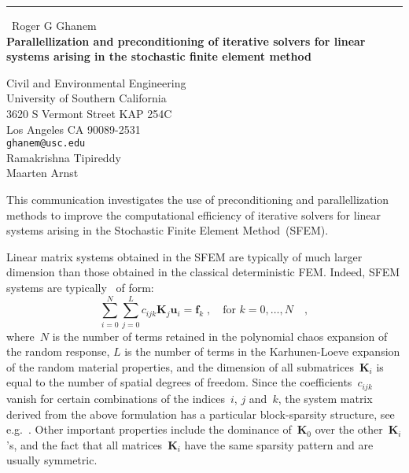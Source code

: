 \documentclass{report}
\begin{document}
\begin{center}
\rule{6in}{1pt} \
{\large Roger G Ghanem \\
{\bf Parallellization and preconditioning of iterative solvers for linear systems arising in the stochastic finite element method}}

Civil and Environmental Engineering \\ University of Southern California \\ 3620 S Vermont Street KAP 254C \\ Los Angeles CA 90089-2531
\\
{\tt ghanem@usc.edu}\\
Ramakrishna Tipireddy\\
Maarten Arnst\end{center}

This communication investigates the use of preconditioning and
parallellization methods to improve the computational efficiency of
iterative solvers for linear systems arising in the Stochastic Finite
Element Method~(SFEM).

Linear matrix systems obtained in the SFEM are typically of much larger
dimension than those obtained in the classical deterministic FEM. Indeed,
SFEM systems are typically~\cite{ghanem1991} of form:
\begin{equation}
\sum_{i=0}^{N}\sum_{j=0}^{L}c_{ijk}\boldsymbol{K}_{j}\boldsymbol{u}_{i}=\boldsymbol{f}_{k}\;,\quad\text{for~$k
= 0,\ldots,N$}\quad,\label{eq:sfemsystem}
\end{equation}
where~$N$ is the number of terms retained in the polynomial chaos
expansion of the random response, $L$ is the number of terms in the
Karhunen-Loeve expansion of the random material properties, and the
dimension of all submatrices~$\boldsymbol{K}_{i}$ is equal to the number
of spatial degrees of freedom. Since the coefficients~$c_{ijk}$ vanish
for certain combinations of the indices~$i$, $j$ and~$k$, the system
matrix derived from the above formulation has a particular block-sparsity
structure, see e.g.~\cite{pellisetti2000}. Other important properties
include the dominance of~$\boldsymbol{K}_0$ over the
other~$\boldsymbol{K}_i$'s, and the fact that all
matrices~$\boldsymbol{K}_i$ have the same sparsity pattern and are
usually symmetric.
\end{document}
